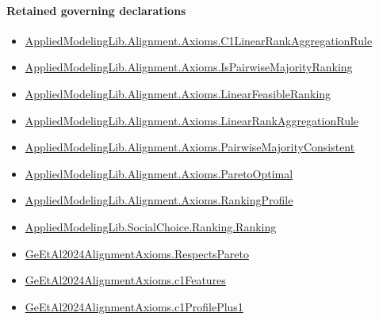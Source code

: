 \documentclass[10pt]{article}
\begin{document}
\paragraph{Retained governing declarations}
\begin{itemize}\raggedright
\item \hyperlink{library-prerequisite-e72857a369826fa4}{Applied\allowbreak{}Modeling\allowbreak{}Lib.\allowbreak{}Alignment.\allowbreak{}Axioms.\allowbreak{}C1\allowbreak{}Linear\allowbreak{}Rank\allowbreak{}Aggregation\allowbreak{}Rule}
\item \hyperlink{governing-declaration-1d952514f8013a9b}{Applied\allowbreak{}Modeling\allowbreak{}Lib.\allowbreak{}Alignment.\allowbreak{}Axioms.\allowbreak{}Is\allowbreak{}Pairwise\allowbreak{}Majority\allowbreak{}Ranking}
\item \hyperlink{library-prerequisite-3c30aae25bef2671}{Applied\allowbreak{}Modeling\allowbreak{}Lib.\allowbreak{}Alignment.\allowbreak{}Axioms.\allowbreak{}Linear\allowbreak{}Feasible\allowbreak{}Ranking}
\item \hyperlink{library-prerequisite-43447e121a1884f9}{Applied\allowbreak{}Modeling\allowbreak{}Lib.\allowbreak{}Alignment.\allowbreak{}Axioms.\allowbreak{}Linear\allowbreak{}Rank\allowbreak{}Aggregation\allowbreak{}Rule}
\item \hyperlink{library-prerequisite-e6dee3706881b80a}{Applied\allowbreak{}Modeling\allowbreak{}Lib.\allowbreak{}Alignment.\allowbreak{}Axioms.\allowbreak{}Pairwise\allowbreak{}Majority\allowbreak{}Consistent}
\item \hyperlink{library-prerequisite-80fdf9d21d096dc8}{Applied\allowbreak{}Modeling\allowbreak{}Lib.\allowbreak{}Alignment.\allowbreak{}Axioms.\allowbreak{}Pareto\allowbreak{}Optimal}
\item \hyperlink{library-prerequisite-9bded048a60dfe0a}{Applied\allowbreak{}Modeling\allowbreak{}Lib.\allowbreak{}Alignment.\allowbreak{}Axioms.\allowbreak{}Ranking\allowbreak{}Profile}
\item \hyperlink{library-prerequisite-5cde54446d1ae021}{Applied\allowbreak{}Modeling\allowbreak{}Lib.\allowbreak{}Social\allowbreak{}Choice.\allowbreak{}Ranking.\allowbreak{}Ranking}
\item \hyperlink{governing-declaration-41812688ac8b1d81}{Ge\allowbreak{}Et\allowbreak{}Al2024\allowbreak{}Alignment\allowbreak{}Axioms.\allowbreak{}Respects\allowbreak{}Pareto}
\item \hyperlink{governing-declaration-9610052b7196515d}{Ge\allowbreak{}Et\allowbreak{}Al2024\allowbreak{}Alignment\allowbreak{}Axioms.\allowbreak{}c1\allowbreak{}Features}
\item \hyperlink{governing-declaration-67441cb057d87c3a}{Ge\allowbreak{}Et\allowbreak{}Al2024\allowbreak{}Alignment\allowbreak{}Axioms.\allowbreak{}c1\allowbreak{}Profile\allowbreak{}Plus1}
\end{itemize}
\end{document}
